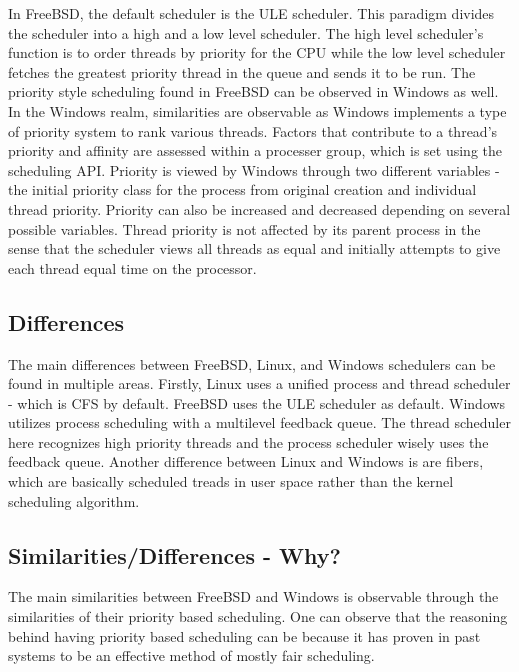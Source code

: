 \documentclass[letterpaper,10pt,titlepage]{article}
\begin{document}
In FreeBSD, the default scheduler is the ULE scheduler.  This paradigm divides the scheduler into a high and a low level scheduler.  The high level scheduler's function is to order threads by priority for the CPU while the low level scheduler fetches the greatest priority thread in the queue and sends it to be run. The priority style scheduling found in FreeBSD can be observed in Windows as well.\\

In the Windows realm, similarities are observable as Windows implements a type of priority system to rank various threads.  Factors that contribute to a thread's priority and affinity are assessed within a processer group, which is set using the scheduling API.  Priority is viewed by Windows through two different variables - the initial priority class for the process from original creation and individual thread priority.  Priority can also be increased and decreased depending on several possible variables.  Thread priority is not affected by its parent process in the sense that the scheduler views all threads as equal and initially attempts to give each thread equal time on the processor.\\

\subsection{Differences}

The main differences between FreeBSD, Linux, and Windows schedulers can be found in multiple areas.  Firstly, Linux uses a unified process and thread scheduler - which is CFS by default.  FreeBSD uses the ULE scheduler as default.  Windows utilizes process scheduling with a multilevel feedback queue.  The thread scheduler here recognizes high priority threads and the process scheduler wisely uses the feedback queue.  Another difference between Linux and Windows is are fibers, which are basically scheduled treads in user space rather than the kernel scheduling algorithm.\\

\subsection{Similarities/Differences - Why?}

The main similarities between FreeBSD and Windows is observable through the similarities of their priority based scheduling.  One can observe that the reasoning behind having priority based scheduling can be because it has proven in past systems to be an effective method of mostly fair scheduling.\\
\end{document}
